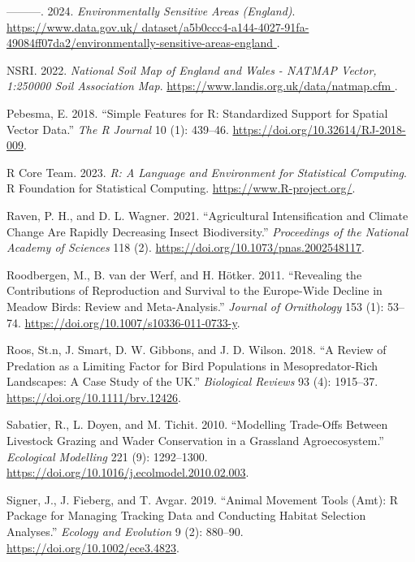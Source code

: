 \documentclass[
  12pt,
  letterpaper,
  DIV=11,
  numbers=noendperiod]{scrartcl}
\newlength{\cslhangindent}
\newenvironment{CSLReferences}[2] %
 {\begin{list}{}{%
  \setlength{\itemindent}{0pt}
  \setlength{\leftmargin}{0pt}
  \setlength{\parsep}{0pt}
  \ifodd #1
   \setlength{\leftmargin}{\cslhangindent}
   \setlength{\itemindent}{-1\cslhangindent}
  \fi
  \setlength{\itemsep}{#2\baselineskip}}}
 {\end{list}}
\begin{document}
\begin{CSLReferences}{1}{0}
---------. 2024. \emph{Environmentally Sensitive Areas (England)}.
\href{https://www.data.gov.uk/\%20dataset/a5b0ccc4-a144-4027-91fa-49084ff07da2/environmentally-sensitive-areas-england\%20}{https://www.data.gov.uk/
dataset/a5b0ccc4-a144-4027-91fa-49084ff07da2/environmentally-sensitive-areas-england
}.

NSRI. 2022. \emph{National Soil Map of England and Wales - NATMAP
Vector, 1:250000 Soil Association Map}.
\href{https://www.landis.org.uk/data/natmap.cfm\%20}{https://www.landis.org.uk/data/natmap.cfm
}.

Pebesma, E. 2018. {``{Simple Features for R: Standardized Support for
Spatial Vector Data}.''} \emph{{The R Journal}} 10 (1): 439--46.
\url{https://doi.org/10.32614/RJ-2018-009}.

R Core Team. 2023. \emph{R: A Language and Environment for Statistical
Computing}. R Foundation for Statistical Computing.
\url{https://www.R-project.org/}.

Raven, P. H., and D. L. Wagner. 2021. {``Agricultural Intensification
and Climate Change Are Rapidly Decreasing Insect Biodiversity.''}
\emph{Proceedings of the National Academy of Sciences} 118 (2).
\url{https://doi.org/10.1073/pnas.2002548117}.

Roodbergen, M., B. van der Werf, and H. Hötker. 2011. {``Revealing the
Contributions of Reproduction and Survival to the Europe-Wide Decline in
Meadow Birds: Review and Meta-Analysis.''} \emph{Journal of Ornithology}
153 (1): 53--74. \url{https://doi.org/10.1007/s10336-011-0733-y}.

Roos, St.n, J. Smart, D. W. Gibbons, and J. D. Wilson. 2018. {``A Review
of Predation as a Limiting Factor for Bird Populations in
Mesopredator{-}Rich Landscapes: A Case Study of the UK.''}
\emph{Biological Reviews} 93 (4): 1915--37.
\url{https://doi.org/10.1111/brv.12426}.

Sabatier, R., L. Doyen, and M. Tichit. 2010. {``Modelling Trade-Offs
Between Livestock Grazing and Wader Conservation in a Grassland
Agroecosystem.''} \emph{Ecological Modelling} 221 (9): 1292--1300.
\url{https://doi.org/10.1016/j.ecolmodel.2010.02.003}.

Signer, J., J. Fieberg, and T. Avgar. 2019. {``Animal Movement Tools
(Amt): R Package for Managing Tracking Data and Conducting Habitat
Selection Analyses.''} \emph{Ecology and Evolution} 9 (2): 880--90.
\url{https://doi.org/10.1002/ece3.4823}.


\end{CSLReferences}
\end{document}
